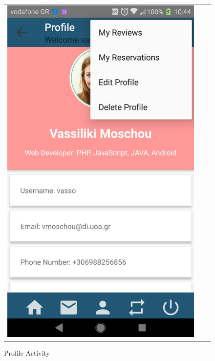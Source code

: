 \documentclass[12pt]{article}
\begin{document}
\begin{center}
\begin{figure}
\begin{tabular}{c c c}
				\includegraphics[scale=0.17, keepaspectratio]{19-profile.jpg}
				\\
			\end{tabular}
			\caption{Profile Activity}
		\end{figure}
	\end{center}
	
\end{document}
